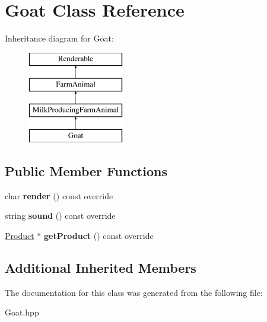 \hypertarget{class_goat}{}\section{Goat Class Reference}
\label{class_goat}
Inheritance diagram for Goat\+:\begin{figure}[H]
\begin{center}
\leavevmode
\includegraphics[height=4.000000cm]{class_goat}
\end{center}
\end{figure}
\subsection*{Public Member Functions}
\begin{DoxyCompactItemize}
\item 
\mbox{\label{class_goat_ac0a538ea14fc410514170ce69ffc4238}} 
char {\bfseries render} () const override
\item 
\mbox{\label{class_goat_a8aea97bfa7992f942c0874a8d56bf21a}} 
string {\bfseries sound} () const override
\item 
\mbox{\label{class_goat_aa6101124675ddd7dabae91e66e33cb5e}} 
\mbox{\hyperlink{class_product}{Product}} $\ast$ {\bfseries get\+Product} () const override
\end{DoxyCompactItemize}
\subsection*{Additional Inherited Members}


The documentation for this class was generated from the following file\+:\begin{DoxyCompactItemize}
\item 
Goat.\+hpp\end{DoxyCompactItemize}
